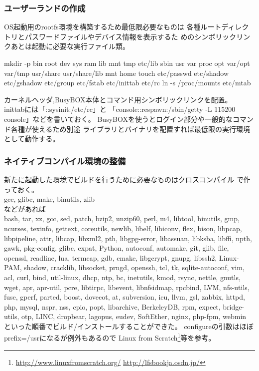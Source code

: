 \documentclass[mingoth,a4paper]{jsarticle}
\begin{document}
\subsubsection{ユーザーランドの作成}
OS起動用のrootfs環境を構築するため最低限必要なものは
各種ルートディレクトリとパスワードファイルやデバイス情報を表示するた
めのシンボリックリンクあとは起動に必要な実行ファイル類。
\begin{commandline}
mkdir -p bin root dev sys ram lib mnt tmp etc/lib sbin usr var proc opt var/opt var/tmp usr/share usr/share/lib mnt home 
touch etc/passwd etc/shadow etc/gshadow etc/group etc/fstab etc/inittab etc/rc
ln -s /proc/mounts etc/mtab 
\end{commandline}
カーネルヘッダ,BusyBOX本体とコマンド用シンボリックリンクを配置。
\\
inittabには「::sysinit:/etc/rc」と
「console::respawn:/sbin/getty  -L 115200 console」などを書いておく。
BusyBOXを使うとログイン部分や一般的なコマンド各種が使えるため別途
ライブラリとバイナリを配置すれば最低限の実行環境として動作する。 

\subsubsection{ネイティブコンパイル環境の整備}
新たに起動した環境でビルドを行うために必要なものはクロスコンパイル
で作っておく。 
\\
gcc, glibc, make, binutils, zlib
\\
などがあれば
\\
bash, tar, xz, gcc, sed, patch, bzip2, unzip60, perl, m4, libtool, binutils, gmp, ncurses, texinfo, gettext, coreutils, newlib, libelf, libiconv, flex, bison, libpcap, libpipeline, attr, libcap, libxml2, pth, libgpg-error, libassuan, libksba, libffi, npth, gawk, pkg-config, glibc, expat, Python, autoconf, automake, git, glib, file, openssl, readline, lua, termcap, gdb, cmake, libgcrypt, gnupg, libssh2, Linux-PAM, shadow, cracklib, libsocket, prngd, openssh, tcl, tk, sqlite-autoconf, vim, acl, curl, bind, util-linux, dhcp, ntp, bc, inetutils, kmod, rsync, nettle, gnutls, wget, apr, apr-util, pcre, libtirpc, libevent, libnfsidmap, rpcbind, LVM, nfs-utils, fuse, gperf, parted, boost, dovecot, at, subversion, icu, llvm, gsl, zabbix, httpd, php, mysql, nspr, nss, cpio, popt, libarchive, BerkeleyDB, rpm, expect, bridge-utils, otp, LINC, dropbear, lagopus, eudev, SoftEther, nginx, php-fpm, webmin
\\
といった順番でビルド/インストールすることができた。 
configureの引数はほぼprefix=/usrになるが例外もあるので
Linux from Scratch\footnote{\url{http://www.linuxfromscratch.org/} \url{http://lfsbookja.osdn.jp/}}等を参考。
\end{document}
